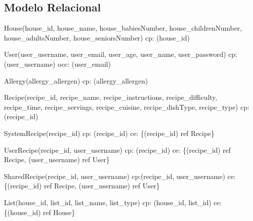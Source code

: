 \subsection{Modelo Relacional}
{\parindent 0pt
	\begin{description}
		\item House(house\_id, house\_name, house\_babiesNumber, house\_childrenNumber, house\_adultsNumber, house\_seniorsNumber) \newline
		\acrshort{cp}: (house\_id) 
		
		\item User(user\_username, user\_email, user\_age, user\_name, user\_password) \newline
		\acrshort{cp}: (user\_username)  \newline
		\acrshort{occ}: (user\_email)
		
		\item Allergy(allergy\_allergen) \newline
		\acrshort{cp}: (allergy\_allergen) 
		
		\item Recipe(recipe\_id, recipe\_name, recipe\_instructions, recipe\_difficulty, recipe\_time, recipe\_servings, recipe\_cuisine, recipe\_dishType, recipe\_type) \newline
		\acrshort{cp}: (recipe\_id) 
		
		\item SystemRecipe(recipe\_id) \newline
		\acrshort{cp}: (recipe\_id) \newline
		\acrshort{ce}: \{(recipe\_id) ref Recipe\}
		
		\item UserRecipe(recipe\_id, user\_username) \newline
		\acrshort{cp}: (recipe\_id) \newline
		\acrshort{ce}: \{(recipe\_id) ref Recipe, (user\_username) ref User\}
		
		\item SharedRecipe(recipe\_id, user\_username) \newline
		\acrshort{cp}:(recipe\_id, user\_username) \newline
		\acrshort{ce}: \{(recipe\_id) ref Recipe, (user\_username) ref User\}
		
		\item List(house\_id, list\_id, list\_name, list\_type) \newline
		\acrshort{cp}: (house\_id, list\_id) \newline
		\acrshort{ce}: \{(house\_id) ref House\}
		

\end{description}}
